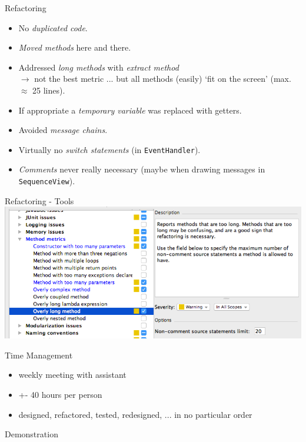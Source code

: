 \documentclass[10pt]{beamer}
\begin{document}
\begin{frame}[fragile]{Refactoring}
\begin{itemize}
\item No \textit{duplicated code}.
\item \textit{Moved methods} here and there.
\item Addressed \textit{long methods} with \textit{extract method} \\
$\rightarrow$ not the best metric ... but all methods (easily) `fit on the screen' (max. $\approx$ 25 lines).
\item If appropriate a \textit{temporary variable} was replaced with getters.
\item Avoided \textit{message chains}.
\item Virtually no \textit{switch statements} (in \texttt{EventHandler}).
\item \textit{Comments} never really necessary (maybe when drawing messages in \texttt{SequenceView}).
\end{itemize}
\end{frame}

\begin{frame}[fragile]{Refactoring - Tools}
	\includegraphics[width=1\textwidth]{refactoring}
\end{frame}

\begin{frame}[fragile]{Time Management}
\begin{itemize}
\item weekly meeting with assistant
\item +- 40 hours per person
\item designed, refactored, tested, redesigned, ... in no particular order
\end{itemize}
\end{frame}

{
\begin{frame}[standout]
  Demonstration
\end{frame}
}
\end{document}
